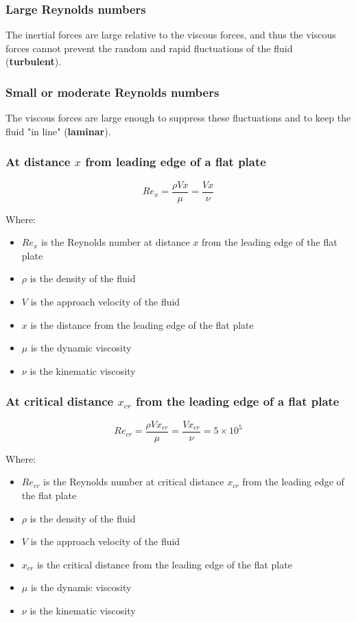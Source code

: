 \documentclass[11pt]{article}
\begin{document}
\subsubsection{Large Reynolds numbers}
\label{sec:org78393dc}
The inertial forces are large relative to the viscous forces, and thus the viscous forces cannot prevent the random and rapid fluctuations of the fluid (\textbf{turbulent}).
\subsubsection{Small or moderate Reynolds numbers}
\label{sec:orgf3d7133}
The viscous forces are large enough to suppress these fluctuations and to keep the fluid "in line" (\textbf{laminar}).
\subsubsection{At distance \(x\) from leading edge of a flat plate}
\label{sec:org719eb72}
\[Re_x = \frac{\rho V x}{\mu} = \frac{Vx}{\nu}\]

Where:
\begin{itemize}
\item \(Re_{x}\) is the Reynolds number at distance \(x\) from the leading edge of the flat plate
\item \(\rho\) is the density of the fluid
\item \(V\) is the approach velocity of the fluid
\item \(x\) is the distance from the leading edge of the flat plate
\item \(\mu\) is the dynamic viscosity
\item \(\nu\) is the kinematic viscosity
\end{itemize}
\subsubsection{At critical distance \(x_{cr}\) from the leading edge of a flat plate}
\label{sec:org2c9128a}
\[Re_{cr} = \frac{\rho V x_{cr}}{\mu} = \frac{V x_{cr}}{\nu} = 5 \times 10^5\]

Where:
\begin{itemize}
\item \(Re_{cr}\) is the Reynolds number at critical distance \(x_{cr}\) from the leading edge of the flat plate
\item \(\rho\) is the density of the fluid
\item \(V\) is the approach velocity of the fluid
\item \(x_{cr}\) is the critical distance from the leading edge of the flat plate
\item \(\mu\) is the dynamic viscosity
\item \(\nu\) is the kinematic viscosity
\end{itemize}
\end{document}
